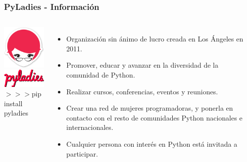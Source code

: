 \documentclass[18pt]{beamer}
\begin{document}
\begin{frame}

	\frametitle{PyLadies - Información}
		
	\begin{columns}
		\centering
			\includegraphics[width=2.5cm]{images/pyladies_cuadrado.png}\\
			\includegraphics[width=3cm]{images/pyladies_alargado.png}\\
			\vspace{0.5cm}			
			\small$>>>$pip install pyladies
			
		\begin{itemize}
			\setlength\itemsep{0.6em}		
			\item Organización sin ánimo de lucro creada en Los Ángeles en 2011.
			\item Promover, educar y avanzar en la diversidad de la comunidad de Python.
			\item Realizar cursos, conferencias, eventos y reuniones. 
			\item Crear una red de mujeres programadoras, y ponerla en contacto con el 
			resto de comunidades Python nacionales e internacionales.
			\item Cualquier persona con interés en Python está invitada a participar.  
		\end{itemize}
	\end{columns}
	
\end{frame}
\end{document}
